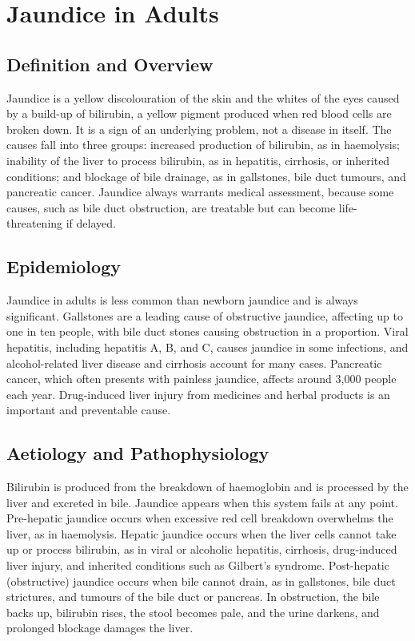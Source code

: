 \chapter{Jaundice in Adults}

\section*{Definition and Overview}
Jaundice is a yellow discolouration of the skin and the whites of the eyes caused by a build-up of bilirubin, a yellow pigment produced when red blood cells are broken down. It is a sign of an underlying problem, not a disease in itself. The causes fall into three groups: increased production of bilirubin, as in haemolysis; inability of the liver to process bilirubin, as in hepatitis, cirrhosis, or inherited conditions; and blockage of bile drainage, as in gallstones, bile duct tumours, and pancreatic cancer. Jaundice always warrants medical assessment, because some causes, such as bile duct obstruction, are treatable but can become life-threatening if delayed.

\section*{Epidemiology}
Jaundice in adults is less common than newborn jaundice and is always significant. Gallstones are a leading cause of obstructive jaundice, affecting up to one in ten people, with bile duct stones causing obstruction in a proportion. Viral hepatitis, including hepatitis A, B, and C, causes jaundice in some infections, and alcohol-related liver disease and cirrhosis account for many cases. Pancreatic cancer, which often presents with painless jaundice, affects around 3,000 people each year. Drug-induced liver injury from medicines and herbal products is an important and preventable cause.

\section*{Aetiology and Pathophysiology}
Bilirubin is produced from the breakdown of haemoglobin and is processed by the liver and excreted in bile. Jaundice appears when this system fails at any point. Pre-hepatic jaundice occurs when excessive red cell breakdown overwhelms the liver, as in haemolysis. Hepatic jaundice occurs when the liver cells cannot take up or process bilirubin, as in viral or alcoholic hepatitis, cirrhosis, drug-induced liver injury, and inherited conditions such as Gilbert's syndrome. Post-hepatic (obstructive) jaundice occurs when bile cannot drain, as in gallstones, bile duct strictures, and tumours of the bile duct or pancreas. In obstruction, the bile backs up, bilirubin rises, the stool becomes pale, and the urine darkens, and prolonged blockage damages the liver.

